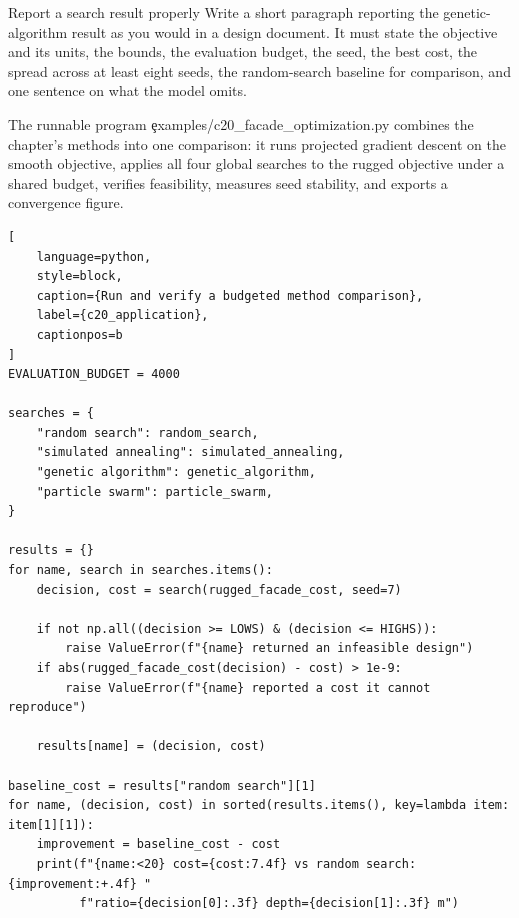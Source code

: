 \begin{TryBox}{Report a search result properly}
Write a short paragraph reporting the genetic-algorithm result as you would in a
design document. It must state the objective and its units, the bounds, the
evaluation budget, the seed, the best cost, the spread across at least eight
seeds, the random-search baseline for comparison, and one sentence on what the
model omits.
\end{TryBox}

\label{sec:c20-application}

The runnable program \c{examples/c20_facade_optimization.py} combines the
chapter's methods into one comparison: it runs projected gradient descent on the
smooth objective, applies all four global searches to the rugged objective under
a shared budget, verifies feasibility, measures seed stability, and exports a
convergence figure.

\begin{lstlisting}[
    language=python,
    style=block,
    caption={Run and verify a budgeted method comparison},
    label={c20_application},
    captionpos=b
]
EVALUATION_BUDGET = 4000

searches = {
    "random search": random_search,
    "simulated annealing": simulated_annealing,
    "genetic algorithm": genetic_algorithm,
    "particle swarm": particle_swarm,
}

results = {}
for name, search in searches.items():
    decision, cost = search(rugged_facade_cost, seed=7)

    if not np.all((decision >= LOWS) & (decision <= HIGHS)):
        raise ValueError(f"{name} returned an infeasible design")
    if abs(rugged_facade_cost(decision) - cost) > 1e-9:
        raise ValueError(f"{name} reported a cost it cannot reproduce")

    results[name] = (decision, cost)

baseline_cost = results["random search"][1]
for name, (decision, cost) in sorted(results.items(), key=lambda item: item[1][1]):
    improvement = baseline_cost - cost
    print(f"{name:<20} cost={cost:7.4f} vs random search: {improvement:+.4f} "
          f"ratio={decision[0]:.3f} depth={decision[1]:.3f} m")
\end{lstlisting}

